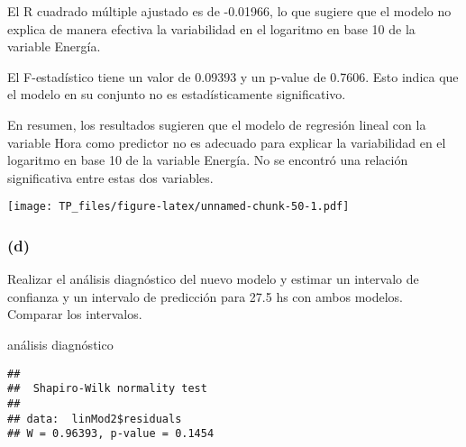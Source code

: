 \documentclass[
]{article}
\newenvironment{Shaded}{\begin{snugshade}}{\end{snugshade}}
\newcommand{\AttributeTok}[1]{\textcolor[rgb]{0.77,0.63,0.00}{#1}}
\newcommand{\DecValTok}[1]{\textcolor[rgb]{0.00,0.00,0.81}{#1}}
\newcommand{\FunctionTok}[1]{\textcolor[rgb]{0.00,0.00,0.00}{#1}}
\newcommand{\NormalTok}[1]{#1}
\newcommand{\SpecialCharTok}[1]{\textcolor[rgb]{0.00,0.00,0.00}{#1}}
\newcommand{\StringTok}[1]{\textcolor[rgb]{0.31,0.60,0.02}{#1}}
\begin{document}
El R cuadrado múltiple ajustado es de -0.01966, lo que sugiere que el
modelo no explica de manera efectiva la variabilidad en el logaritmo en
base 10 de la variable Energía.

El F-estadístico tiene un valor de 0.09393 y un p-value de 0.7606. Esto
indica que el modelo en su conjunto no es estadísticamente
significativo.

En resumen, los resultados sugieren que el modelo de regresión lineal
con la variable Hora como predictor no es adecuado para explicar la
variabilidad en el logaritmo en base 10 de la variable Energía. No se
encontró una relación significativa entre estas dos variables.

\begin{Shaded}
\end{Shaded}

\texttt{[image: TP\_files/figure-latex/unnamed-chunk-50-1.pdf]}

\hypertarget{d-2}{%
\subsubsection{(d)}\label{d-2}}

Realizar el análisis diagnóstico del nuevo modelo y estimar un intervalo
de confianza y un intervalo de predicción para 27.5 hs con ambos
modelos. Comparar los intervalos.

análisis diagnóstico

\begin{Shaded}
\end{Shaded}

\begin{verbatim}
## 
##  Shapiro-Wilk normality test
## 
## data:  linMod2$residuals
## W = 0.96393, p-value = 0.1454
\end{verbatim}
\end{document}
